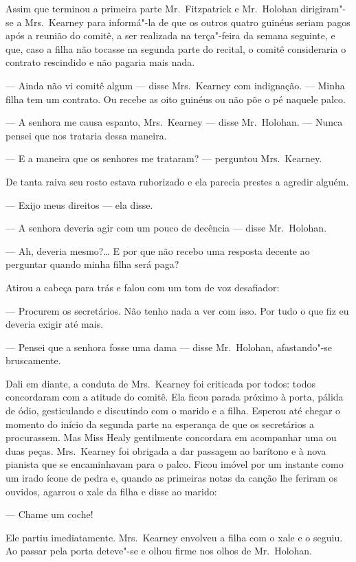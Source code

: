 Assim que terminou a primeira parte Mr.~Fitzpatrick e Mr.~Holohan dirigiram"-se
a Mrs.~Kearney para informá"-la de que os outros quatro guinéus seriam pagos
após a reunião do comitê, a ser realizada na terça"-feira da semana seguinte, e
que, caso a filha não tocasse na segunda parte do recital, o comitê
consideraria o contrato rescindido e não pagaria mais nada.

--- Ainda não vi comitê algum --- disse Mrs.~Kearney com indignação.  --- Minha
filha tem um contrato.  Ou recebe as oito guinéus ou não põe o pé naquele
palco.

--- A senhora me causa espanto, Mrs.~Kearney --- disse Mr.~Holohan.  --- Nunca
pensei que nos trataria dessa maneira.

--- E a maneira que os senhores me trataram? --- perguntou Mrs.~Kearney.

De tanta raiva seu rosto estava ruborizado e ela parecia prestes a agredir
alguém.

--- Exijo meus direitos --- ela disse.

--- A senhora deveria agir com um pouco de decência --- disse Mr.~Holohan.

--- Ah, deveria mesmo?\ldots{}  E por que não recebo uma resposta decente ao
perguntar quando minha filha será paga?

Atirou a cabeça para trás e falou com um tom de voz desafiador:

--- Procurem os secretários.  Não tenho nada a ver com isso.  Por tudo o que
fiz eu deveria exigir até mais.

--- Pensei que a senhora fosse uma dama --- disse Mr.~Holohan, afastando"-se
bruscamente.

Dali em diante, a conduta de Mrs.~Kearney foi criticada por todos: todos
concordaram com a atitude do comitê.  Ela ficou parada próximo à porta, pálida
de ódio, gesticulando e discutindo com o marido e a filha.  Esperou até chegar
o momento do início da segunda parte na esperança de que os secretários a
procurassem.  Mas Miss Healy gentilmente concordara em acompanhar uma ou duas
peças.  Mrs.~Kearney foi obrigada a dar passagem ao barítono e à nova pianista
que se encaminhavam para o palco.  Ficou imóvel por um instante como um irado
ícone de pedra e, quando as primeiras notas da canção lhe feriram os ouvidos,
agarrou o xale da filha e disse ao marido:

--- Chame um coche!

Ele partiu imediatamente.  Mrs.~Kearney envolveu a filha com o xale e o seguiu.
Ao passar pela porta deteve"-se e olhou firme nos olhos de Mr.~Holohan.

